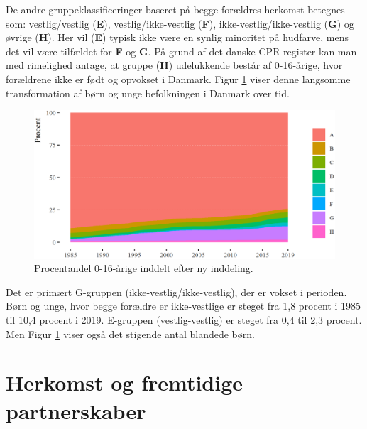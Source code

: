 \documentclass[
]{book}
\begin{document}
De andre gruppeklassificeringer baseret på begge forældres herkomst betegnes som: vestlig/vestlig (\textbf{E}), vestlig/ikke-vestlig (\textbf{F}), ikke-vestlig/ikke-vestlig (\textbf{G}) og øvrige (\textbf{H}). Her vil (\textbf{E}) typisk ikke være en synlig minoritet på hudfarve, mens det vil være tilfældet for \textbf{F} og \textbf{G}. På grund af det danske CPR-register kan man med rimelighed antage, at gruppe (\textbf{H}) udelukkende består af 0-16-årige, hvor forældrene ikke er født og opvokset i Danmark. Figur \ref{fig:fig-3-01} viser denne langsomme transformation af børn og unge befolkningen i Danmark over tid.

\begin{figure}
\includegraphics[width=1\linewidth]{images/figur_3_1} \caption{ Procentandel 0-16-årige inddelt efter ny inddeling.}\label{fig:fig-3-01}
\end{figure}

Det er primært G-gruppen (ikke-vestlig/ikke-vestlig), der er vokset i perioden. Børn og unge, hvor begge forældre er ikke-vestlige er steget fra 1,8 procent i 1985 til 10,4 procent i 2019. E-gruppen (vestlig-vestlig) er steget fra 0,4 til 2,3 procent. Men Figur \ref{fig:fig-3-01} viser også det stigende antal blandede børn.

\section{Herkomst og fremtidige partnerskaber}\label{herkomst-og-fremtidige-partnerskaber}
\end{document}
